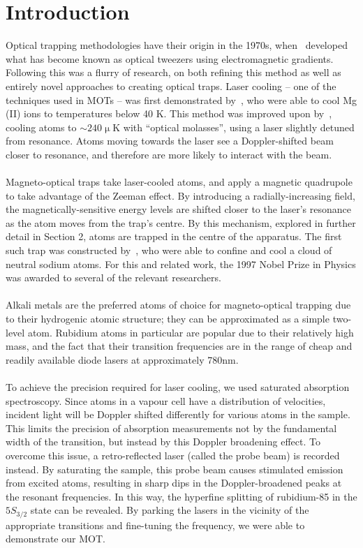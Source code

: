 \documentclass[11pt,twoside,a4paper]{article}
\begin{document}
\section{Introduction}
Optical trapping methodologies have their origin in the 1970s, when~\cite{ashkin1970} developed what has become known
as optical tweezers using electromagnetic gradients. Following this was a flurry of research, on both refining this method
as well as entirely novel approaches to creating optical traps. Laser cooling -- one of the techniques used in MOTs -- was
first demonstrated by~\cite{wineland1978}, who were able to cool Mg (II) ions to temperatures below 40 K. This method was improved
upon by~\cite{chu1985}, cooling atoms to \(\sim240 \operatorname{\mu}\)K with ``optical molasses'', using a laser slightly detuned from resonance.
Atoms moving towards the laser see a Doppler-shifted beam closer to resonance, and therefore are more likely to interact with the beam.
\\\\
Magneto-optical traps take laser-cooled atoms, and apply a magnetic quadrupole to take advantage of the Zeeman effect. By
introducing a radially-increasing field, the magnetically-sensitive energy levels are shifted closer to the laser's resonance as the atom moves
from the trap's centre. By this mechanism, explored in further detail in Section 2, atoms are trapped in the centre of the
apparatus. The first such trap was constructed by~\cite{raab1987}, who were able to confine and cool a cloud of neutral sodium atoms. For this and related
work, the 1997 Nobel Prize in Physics was awarded to several of the relevant researchers.
\\\\
Alkali metals are the preferred atoms of choice for magneto-optical trapping due to their hydrogenic atomic structure; they can be approximated
as a simple two-level atom. Rubidium atoms in particular are popular due to their relatively high mass, and the fact that their transition frequencies
are in the range of cheap and readily available diode lasers at approximately 780nm.
\\\\
To achieve the precision required for laser cooling, we used saturated absorption spectroscopy. Since atoms in a vapour cell have a distribution of velocities,
incident light will be Doppler shifted differently for various atoms in the sample. This limits the precision of absorption measurements not by the fundamental width
of the transition, but instead by this Doppler broadening effect. To overcome this issue, a retro-reflected laser (called the probe beam) is recorded instead. By saturating the sample,
this probe beam causes stimulated emission from excited atoms, resulting in sharp dips in the Doppler-broadened peaks at the resonant frequencies. In this way, the hyperfine splitting of rubidium-85 in the
\(5S_{3/2}\) state can be revealed. By parking the lasers in the vicinity of the appropriate transitions and fine-tuning the frequency, we were able to demonstrate our MOT.\@
\vfill
\end{document}
